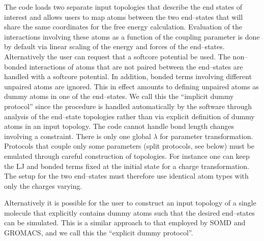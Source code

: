 \documentclass[journal=jctcce,manuscript=article]{achemso}
\begin{document}
The code loads two separate input topologies that describe the end
states of interest and allows users to map atoms between the two
end--states that will share the same coordinates for the free energy
calculation.  Evaluation of the interactions involving these atoms as
a function of the coupling parameter is done by default via linear
scaling of the energy and forces of the end--states.  Alternatively
the user can request that a softcore potential be used.  The
non--bonded interactions of atoms that are not paired between the
end--states are handled with a softcore potential.  In addition,
bonded terms involving different unpaired atoms are ignored.  This in
effect amounts to defining unpaired atoms as dummy atoms in one of the
end--states.  We call this the ``implicit dummy protocol'' since the
procedure is handled automatically by the software through analysis of
the end--state topologies rather than via explicit definition of dummy
atoms in an input topology.
%
%
%
The code cannot handle bond length changes involving a constraint.
There is only one global $\lambda$ for parameter transformation.
Protocols that couple only some parameters (split protocols, see
below) must be emulated through careful construction of topologies.  For instance one can keep the LJ and bonded terms fixed at the initial state for a charge transformation.  The setup for
the two end--states must therefore use identical atom types with only the charges varying.

Alternatively it is possible for the user to construct an input
topology of a single molecule that explicitly contains dummy atoms
such that the desired end--states can be simulated.  This is a similar approach to that employed by SOMD and GROMACS, and we call this the ``explicit dummy protocol''.

\end{document}
